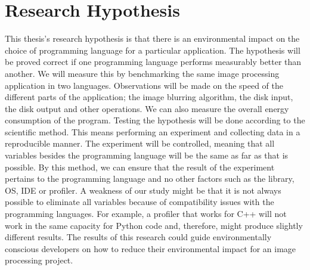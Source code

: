 \chapter{Research Hypothesis}
This thesis’s research hypothesis is that there is an environmental impact on the choice of programming language for a particular application.
The hypothesis will be proved correct if one programming language performs measurably better than another. We will measure this by benchmarking the same image processing application in two languages. Observations will be made on the speed of the different parts of the application; the image blurring algorithm, the disk input, the disk output and other operations. We can also measure the overall energy consumption of the program.
Testing the hypothesis will be done according to the scientific method. This means performing an experiment and collecting data in a reproducible manner. The experiment will be controlled, meaning that all variables besides the programming language will be the same as far as that is possible. By this method, we can ensure that the result of the experiment pertains to the programming language and no other factors such as the library, OS, IDE or profiler.
A weakness of our study might be that it is not always possible to eliminate all variables because of compatibility issues with the programming languages. For example, a profiler that works for C++ will not work in the same capacity for Python code and, therefore, might produce slightly different results.
The results of this research could guide environmentally conscious developers on how to reduce their environmental impact for an image processing project.
